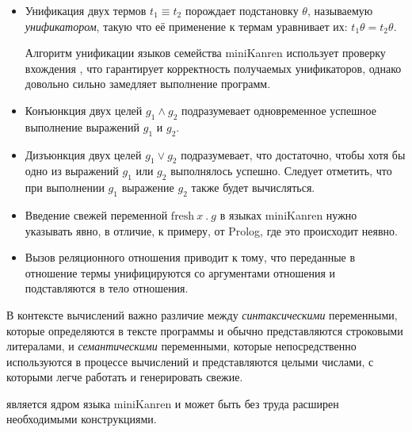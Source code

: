 \begin{itemize}
\item Унификация двух термов $t_1 \equiv t_2$ порождает подстановку $\theta$, называемую \emph{унификатором},
      такую что её применение к термам уравнивает их: $t_1 \theta = t_2 \theta$.

      Алгоритм унификации языков семейства miniKanren использует проверку вхождения ,
      что гарантирует корректность получаемых унификаторов, однако довольно сильно замедляет выполнение программ.

\item Конъюнкция двух целей $g_1 \land g_2$ подразумевает одновременное успешное выполнение выражений $g_1$ и $g_2$.
\item Дизъюнкция двух целей $g_1 \lor g_2$ подразумевает, что достаточно, чтобы хотя бы одно из выражений $g_1$ или $g_2$ выполнялось успешно.
      Следует отметить, что при выполнении $g_1$ выражение $g_2$ также будет вычисляться.
\item Введение свежей переменной $\text{fresh}\ x\ .\ g$ в языках miniKanren нужно указывать явно, в отличие, к примеру,
      от Prolog, где это происходит неявно.
\item Вызов реляционного отношения приводит к тому, что переданные в отношение термы
      унифицируются со аргументами отношения и подставляются в тело отношения. 
\end{itemize}

В контексте вычислений важно различие между \emph{синтаксическими} переменными, которые
определяются в тексте программы и обычно представляются строковыми литералами, и
\emph{семантическими} переменными, которые непосредственно используются в процессе вычислений и
представляются целыми числами, с которыми легче работать и генерировать свежие.

\ukanren является ядром языка miniKanren и может быть без труда расширен необходимыми
конструкциями.
